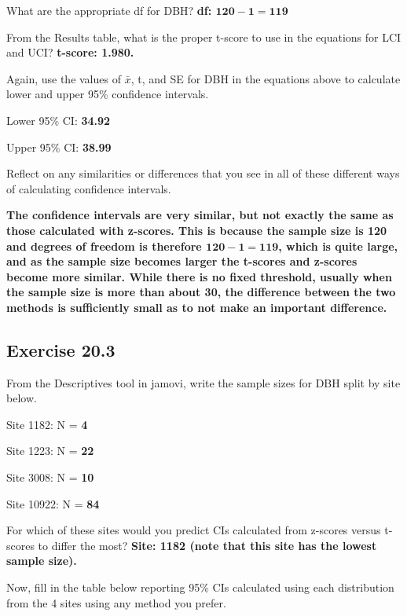 \documentclass[
  openany]{krantz}
\begin{document}
What are the appropriate df for DBH? \textbf{df: \(\mathbf{120 - 1 = 119}\)}

From the Results table, what is the proper t-score to use in the equations for LCI and UCI? \textbf{t-score: 1.980.}

Again, use the values of \(\bar{x}\), t, and SE for DBH in the equations above to calculate lower and upper 95\% confidence intervals.

Lower 95\% CI: \textbf{34.92}

Upper 95\% CI: \textbf{38.99}

Reflect on any similarities or differences that you see in all of these different ways of calculating confidence intervals.

\textbf{The confidence intervals are very similar, but not exactly the same as those calculated with z-scores. This is because the sample size is 120 and degrees of freedom is therefore \(\mathbf{120 - 1 = 119}\), which is quite large, and as the sample size becomes larger the t-scores and z-scores become more similar. While there is no fixed threshold, usually when the sample size is more than about 30, the difference between the two methods is sufficiently small as to not make an important difference.}

\hypertarget{exercise-20.3}{%
\subsection{Exercise 20.3}\label{exercise-20.3}}

From the Descriptives tool in jamovi, write the sample sizes for DBH split by site below.

Site 1182: N = \textbf{4}

Site 1223: N = \textbf{22}

Site 3008: N = \textbf{10}

Site 10922: N = \textbf{84}

For which of these sites would you predict CIs calculated from z-scores versus t- scores to differ the most? \textbf{Site: 1182 (note that this site has the lowest sample size).}

Now, fill in the table below reporting 95\% CIs calculated using each distribution from the 4 sites using any method you prefer.
\end{document}
